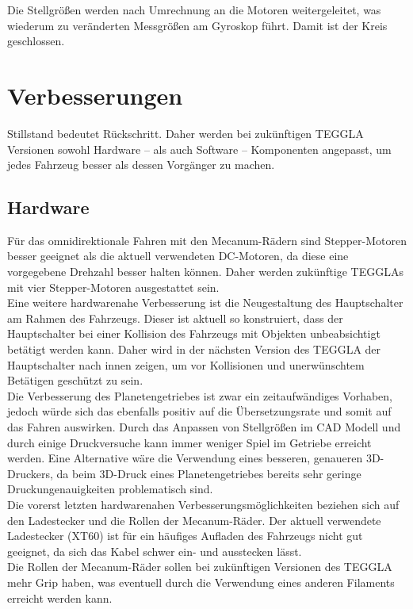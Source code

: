 Die Stellgrößen werden nach Umrechnung an die Motoren weitergeleitet, was wiederum zu veränderten Messgrößen am Gyroskop führt. 
Damit ist der Kreis geschlossen. 


\section{Verbesserungen}
Stillstand bedeutet Rückschritt. Daher werden bei zukünftigen TEGGLA Versionen sowohl Hardware -- als auch Software -- Komponenten angepasst, um jedes Fahrzeug besser als dessen Vorgänger zu machen.

\subsection{Hardware}
Für das omnidirektionale Fahren mit den Mecanum-Rädern sind Stepper-Motoren besser geeignet als die aktuell verwendeten DC-Motoren, da diese eine vorgegebene Drehzahl besser halten können. Daher werden zukünftige TEGGLAs mit vier Stepper-Motoren ausgestattet sein.\\

Eine weitere hardwarenahe Verbesserung ist die Neugestaltung des Hauptschalter am Rahmen des Fahrzeugs. Dieser ist aktuell so konstruiert, dass der Hauptschalter bei einer Kollision des Fahrzeugs mit Objekten unbeabsichtigt betätigt werden kann. Daher wird in der nächsten Version des TEGGLA der Hauptschalter nach innen zeigen, um vor Kollisionen und unerwünschtem Betätigen geschützt zu sein.\\

Die Verbesserung des Planetengetriebes ist zwar ein zeitaufwändiges Vorhaben, jedoch würde sich das ebenfalls positiv auf die Übersetzungsrate und somit auf das Fahren auswirken. Durch das Anpassen von Stellgrößen im CAD Modell und durch einige Druckversuche kann immer weniger Spiel im Getriebe erreicht werden. Eine Alternative wäre die Verwendung eines besseren, genaueren 3D-Druckers, da beim 3D-Druck eines Planetengetriebes bereits sehr geringe Druckungenauigkeiten problematisch sind.\\

Die vorerst letzten hardwarenahen Verbesserungsmöglichkeiten beziehen sich auf den Ladestecker und die Rollen der Mecanum-Räder. Der aktuell verwendete Ladestecker (XT60) ist für ein häufiges Aufladen des Fahrzeugs nicht gut geeignet, da sich das Kabel schwer ein- und ausstecken lässt.\\

Die Rollen der Mecanum-Räder sollen bei zukünftigen Versionen des TEGGLA mehr Grip haben, was eventuell durch die Verwendung eines anderen Filaments erreicht werden kann.\\


